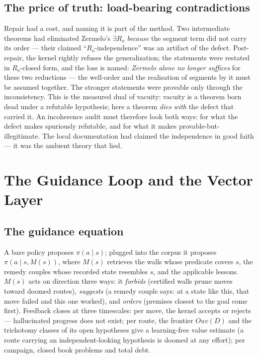 \documentclass[11pt]{article}
\theoremstyle{remark}\newtheorem{example}{Example}
\begin{document}
\subsection{The price of truth: load-bearing contradictions}
Repair had a cost, and naming it is part of the method. Two intermediate theorems
had eliminated Zermelo's $\exists R_o$ \emph{because} the segment term did not carry
its order --- their claimed ``$R_o$-independence'' was an artifact of the defect.
Post-repair, the kernel rightly refuses the generalization; the statements were
restated in $R_o$-closed form, and the loss is named: \emph{Zermelo alone no longer
suffices} for these two reductions --- the well-order and the realisation of segments
by it must be assumed together. The stronger statements were provable only through the
inconsistency. This is the measured dual of vacuity: vacuity is a theorem born dead
under a refutable hypothesis; here a theorem \emph{dies with} the defect that carried
it. An incoherence audit must therefore look both ways: for what the defect makes
spuriously refutable, and for what it makes provable-but-illegitimate. The local
documentation had claimed the independence in good faith --- it was the ambient theory
that lied.

\section{The Guidance Loop and the Vector Layer}
\label{sec:vectors}
\subsection{The guidance equation}
A bare policy proposes $\pi(a \mid s)$; plugged into the corpus it proposes
$\pi(a \mid s, M(s))$, where $M(s)$ retrieves the walls whose predicate covers $s$,
the remedy couples whose recorded state resembles $s$, and the applicable lessons.
$M(s)$ acts on direction three ways: it \emph{forbids} (certified walls prune moves
toward doomed routes), \emph{suggests} (a remedy couple says: at a state like this,
that move failed and this one worked), and \emph{orders} (premises closest to the
goal come first). Feedback closes at three timescales: per move, the kernel accepts
or rejects --- hallucinated progress does not exist; per route, the frontier
$\mathit{Ouv}(D)$ and the trichotomy classes of its open hypotheses give a
learning-free value estimate (a route carrying an independent-looking hypothesis is
doomed at any effort); per campaign, closed book problems and total debt.
\end{document}
